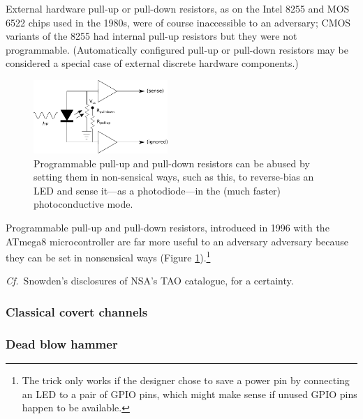 \documentclass[a4paper,twoside]{book}
\begin{document}
External hardware pull-up or pull-down resistors, as on the Intel 8255 and MOS
6522 chips used in the 1980s, were of course inaccessible to an adversary; CMOS
variants of the 8255 had internal pull-up resistors but they were not
programmable. (Automatically configured pull-up or pull-down resistors may be
considered a special case of external discrete hardware components.)
\begin{figure}[ht]
  \centering
  \includegraphics[width=2in]{nonsensical.pdf}
  \caption{Programmable pull-up and pull-down resistors can be abused by
    setting them in non-sensical ways, such as this, to reverse-bias an LED
    and sense it---as a photodiode---in the (much faster) photoconductive
    mode.}
  \label{figure:nonsensical}
\end{figure}
Programmable pull-up and pull-down resistors, introduced in 1996 with the
ATmega8 microcontroller \cite{Atmel2013} are far more useful to an adversary
adversary because they can be set in nonsensical ways (Figure
\ref{figure:nonsensical}).\footnote{The trick only works if the designer chose
to save a power pin by connecting an LED to a pair of GPIO pins, which might
make sense if unused GPIO pins happen to be available.}

{\it Cf.}\ Snowden's disclosures of NSA's TAO catalogue, for a certainty.
\subsubsection{Classical covert channels}
\subsubsection{Dead blow hammer}


\end{document}
